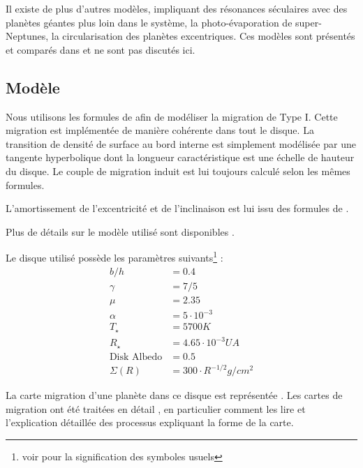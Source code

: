 Il existe de plus d'autres modèles, impliquant des résonances séculaires avec des planètes géantes plus loin dans le système, la photo-évaporation de super-Neptunes, la circularisation des planètes excentriques. Ces modèles sont présentés et comparés dans \cite{raymond2008observable} et ne sont pas discutés ici. 

\subsection{Modèle}
Nous utilisons les formules de \cite{paardekooper2011torque} afin de modéliser la migration de Type I. Cette migration est implémentée de manière cohérente dans tout le disque. La transition de densité de surface au bord interne est simplement modélisée par une tangente hyperbolique dont la longueur caractéristique est une échelle de hauteur du disque. Le couple de migration induit est lui toujours calculé selon les mêmes formules. 

L'amortissement de l'excentricité et de l'inclinaison est lui issu des formules de \cite{cresswell2008three}. 

Plus de détails sur le modèle utilisé sont disponibles .

Le disque utilisé possède les paramètres suivants\footnote{voir  pour la signification des symboles usuels} : 
\begin{align*}
b/h &= 0.4\\
\gamma &= 7/5\\
\mu &= 2.35\\
\alpha &= 5\cdot 10^{-3}\\
T_\star &= 5700\unit{K}\\
R_\star &= 4.65\cdot 10^{-3}\unit{UA}\\
\text{Disk Albedo} &= 0.5\\
\Sigma(R) &= 300 \cdot R^{-1/2}\unit{g/cm^2}
\end{align*}

La carte migration d'une planète dans ce disque est représentée . Les cartes de migration ont été traitées en détail , en particulier comment les lire et l'explication détaillée des processus expliquant la forme de la carte.

